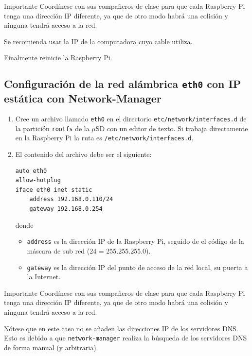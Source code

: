 \documentclass[letterpaper,10.5pt]{article}
\begin{document}
\begin{greenbox}{Importante}
Coordínese con sus compañeros de clase para que cada Raspberry Pi tenga una dirección IP diferente, ya que de otro modo habrá una colisión y ninguna tendrá acceso a la red.

Se recomienda usar la IP de la computadora cuyo cable utiliza.
\end{greenbox}

\noindent
Finalmente reinicie la Raspberry Pi.

\subsection{Configuración de la red alámbrica \texttt{eth0} con IP estática con Network-Manager}%
\label{sec:setup-eth0-nm}

\begin{enumerate}

	\item Cree un archivo llamado \texttt{eth0} en el directorio \texttt{etc/network/interfaces.d} de la partición \texttt{rootfs} de la $\mu$SD con un editor de texto.
	Si trabaja directamente en la Raspberry Pi la ruta es \texttt{/etc/network/interfaces.d}.

	\item El contenido del archivo debe ser el siguiente:
\begin{Verbatim}[fontsize=\footnotesize]
auto eth0
allow-hotplug
iface eth0 inet static
    address 192.168.0.110/24
    gateway 192.168.0.254
\end{Verbatim}
	donde
	\begin{itemize}
		\item \texttt{address} es la dirección IP de la Raspberry Pi, seguido de el código de la máscara de sub red (24 = 255.255.255.0).
		\item \texttt{gateway} es la dirección IP del punto de acceso de la red local, su puerta a la Internet.
	\end{itemize}
\end{enumerate}

\begin{greenbox}{Importante}
Coordínese con sus compañeros de clase para que cada Raspberry Pi tenga una dirección IP diferente, ya que de otro modo habrá una colisión y ninguna tendrá acceso a la red.
\end{greenbox}

Nótese que en este caso no se añaden las direcciones IP de los servidores DNS. %
Esto es debido a que \texttt{network-manager} realiza la búsqueda de los servidores DNS de forma manual (y arbitraria).
\end{document}
